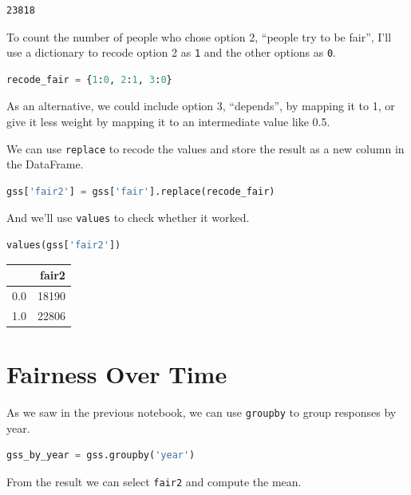 \begin{lstlisting}[style=output]
23818
\end{lstlisting}

To count the number of people who chose option 2, ``people try to be
fair'', I'll use a dictionary to recode option 2 as
\passthrough{\lstinline!1!} and the other options as
\passthrough{\lstinline!0!}.

\begin{lstlisting}[language=Python,style=source]
recode_fair = {1:0, 2:1, 3:0}
\end{lstlisting}

As an alternative, we could include option 3, ``depends'', by mapping it
to 1, or give it less weight by mapping it to an intermediate value like
0.5.

We can use \passthrough{\lstinline!replace!} to recode the values and
store the result as a new column in the DataFrame.

\begin{lstlisting}[language=Python,style=source]
gss['fair2'] = gss['fair'].replace(recode_fair)
\end{lstlisting}

And we'll use \passthrough{\lstinline!values!} to check whether it
worked.

\begin{lstlisting}[language=Python,style=source]
values(gss['fair2'])
\end{lstlisting}

\begin{tabular}{lr}
\toprule
{} &  fair2 \\
\midrule
0.0 &  18190 \\
1.0 &  22806 \\
\bottomrule
\end{tabular}

\hypertarget{fairness-over-time}{%
\section{Fairness Over Time}\label{fairness-over-time}}

As we saw in the previous notebook, we can use
\passthrough{\lstinline!groupby!} to group responses by year.

\begin{lstlisting}[language=Python,style=source]
gss_by_year = gss.groupby('year')
\end{lstlisting}

From the result we can select \passthrough{\lstinline!fair2!} and
compute the mean.

